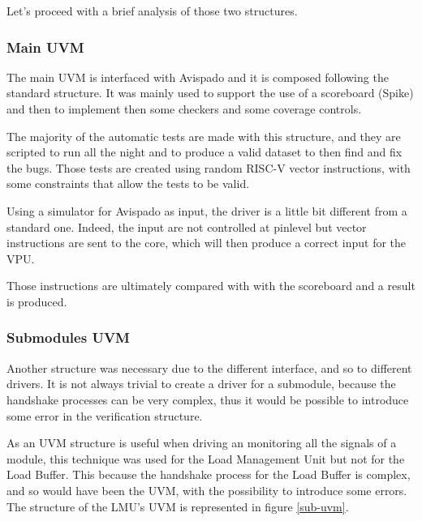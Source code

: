 Let's proceed with a brief analysis of those two structures.

\subsubsection{Main UVM}
The main UVM is interfaced with Avispado and it is composed following the standard structure. It was mainly used to support the use of a scoreboard (Spike) and then to implement then some checkers and some coverage controls.

The majority of the automatic tests are made with this structure, and they are scripted to run all the night and to produce a valid dataset to then find and fix the bugs. Those tests are created using random RISC-V vector instructions, with some constraints that allow the tests to be valid.

Using a simulator for Avispado as input, the driver is a little bit different from a standard one. Indeed, the input are not controlled at pinlevel but vector instructions are sent to the core, which will then produce a correct input for the VPU.

Those instructions are ultimately compared with with the scoreboard and a result is produced.

\subsubsection{Submodules UVM}

Another structure was necessary due to the different interface, and so to different drivers. It is not always trivial to create a driver for a submodule, because the handshake processes can be very complex, thus it would be possible to introduce some error in the verification structure.


As an UVM structure is useful when driving an monitoring all the signals of a module, this technique was used for the Load Management Unit but not for the Load Buffer. This because the handshake process for the Load Buffer is complex, and so would have been the UVM, with the possibility to introduce some errors.
The structure of the LMU's UVM is represented in figure \ref{sub-uvm}.

